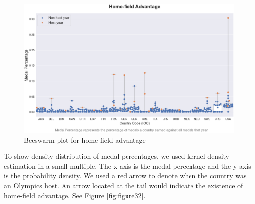 \documentclass[
]{article}
\begin{document}
\begin{figure}

{\centering \includegraphics[width=1\linewidth]{static/vis/g-2-8} 

}

\caption{Beeswarm plot for home-field advantage}\label{fig:figure31}
\end{figure}

To show density distribution of medal percentages, we used kernel density estimation in a small multiple. The x-axis is the medal percentage and the y-axis is the probability density. We used a red arrow to denote when the country was an Olympics host. An arrow located at the tail would indicate the existence of home-field advantage. See Figure \ref{fig:figure32}.
\end{document}
